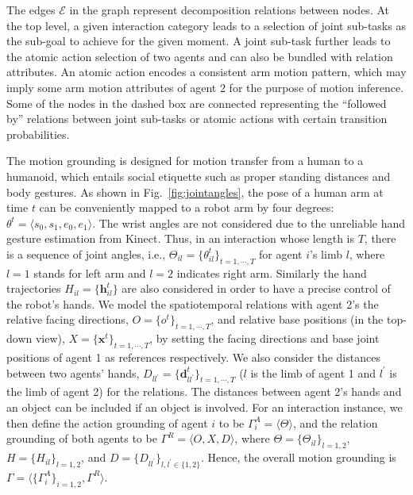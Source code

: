 \documentclass[letterpaper, 10 pt, conference]{ieeeconf}  %
\def \hb{\bm{h}} %
\def \xb{\bm{x}} %
\def \db{\bm{d}} %
\begin{document}
   The edges $\mathcal{E}$ in the graph represent decomposition relations between nodes. At the top level, a given interaction category leads to a selection of joint sub-tasks as the sub-goal to achieve for the given moment. A joint sub-task further leads to the atomic action selection of two agents and can also be bundled with relation attributes. An atomic action encodes a consistent arm motion pattern, which may imply some arm motion attributes of agent 2 for the purpose of motion inference. Some of the nodes in the dashed box are connected representing the ``followed by'' relations between joint sub-tasks or atomic actions with certain transition probabilities.%
   
   The motion grounding is designed for motion transfer from a human to a humanoid, which entails social etiquette such as proper standing distances and body gestures. As shown in Fig.~\ref{fig:jointangles}, the pose of a human arm at time $t$ can be conveniently mapped to a robot arm by four degrees: $\theta^t = \langle s_0, s_1, e_0, e_1 \rangle$. The wrist angles are not considered due to the unreliable hand gesture estimation from Kinect. Thus, in an interaction whose length is $T$, there is a sequence of joint angles, i.e., $\Theta_{il} = \{\theta_{il}^t\}_{t = 1,\cdots,T}$ for agent $i$'s limb $l$, where $l = 1$ stands for left arm and $l = 2$ indicates right arm. Similarly the hand trajectories $H_{il} = \{\hb_{il}^t\}$ are also considered in order to have a precise control of the robot's hands. We model the spatiotemporal relations with agent 2's the relative facing directions, $O = \{o^t\}_{t = 1,\cdots,T}$, and relative base positions (in the top-down view), $X = \{\xb^t\}_{t = 1,\cdots,T}$, by setting the facing directions and base joint positions of agent 1 as references respectively. We also consider the distances between two agents' hands, $D_{ll^\prime} = \{\db_{ll^\prime}^t\}_{t = 1,\cdots,T}$ ($l$ is the limb of agent 1 and $l^\prime$ is the limb of agent 2) for the relations. The distances between agent 2's hands and an object can be included if an object is involved. For an interaction instance, we then define the action grounding of agent $i$ to be $\Gamma^A_i = \langle \Theta \rangle$, and the relation grounding of both agents to be $\Gamma^R = \langle O, X, D \rangle$, where $ \Theta = \{\Theta_{il}\}_{l=1,2}$, $H = \{H_{il}\}_{l=1,2}$, and $D = \{D_{ll^\prime}\}_{l,l^\prime \in \{1,2\}}$. Hence, the overall motion grounding is $\Gamma = \langle \{\Gamma^A_i\}_{i=1,2}, \Gamma^R \rangle$.
   
\end{document}

